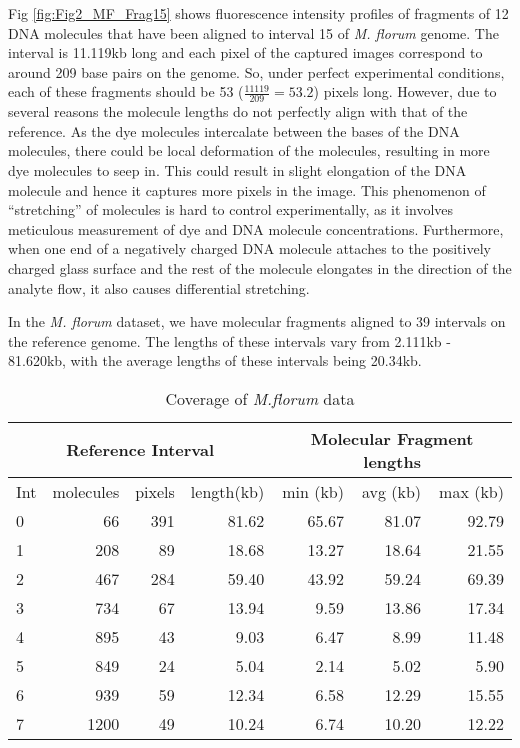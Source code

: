 Fig \ref{fig:Fig2_MF_Frag15} shows fluorescence intensity profiles of fragments of 12 DNA molecules that have been aligned to interval 15 of {\emph{M. florum}} genome. The interval is 11.119kb long and each pixel of the captured images correspond to around 209 base pairs on the genome. So, under perfect experimental conditions, each of these fragments should be 53 ($\frac{11119}{209} = 53.2$) pixels long. However, due to several reasons the molecule lengths do not perfectly align with that of the reference. As the dye molecules intercalate between the bases of the DNA molecules, there could be local deformation of the molecules, resulting in more dye molecules to seep in. This could result in slight elongation of the DNA molecule and hence it captures more pixels in the image. This phenomenon of ``stretching'' of molecules is hard to control experimentally, as it involves meticulous measurement of dye and DNA molecule concentrations. Furthermore, when one end of a negatively charged DNA molecule attaches to the positively charged glass surface and the rest of the molecule elongates in the direction of the analyte flow, it also causes differential stretching. 

In the {\emph{M. florum}} dataset, we have molecular fragments aligned to 39 intervals on the reference genome. The lengths of these intervals vary from 2.111kb - 81.620kb, with the average lengths of these intervals being 20.34kb. 
\begin{table}[H]
\centering
\begin{tabular}{lrrr|rrr}
  \hline
  \hline
  \multicolumn{4}{c}{Reference Interval} & \multicolumn{3}{c}{Molecular Fragment lengths} \\
  \hline
   Int  & molecules & pixels & length(kb) & min (kb) & avg (kb) & max (kb)\\ 
  \hline
  \hline
    0 &  66 & 391 & 81.62 & 65.67 & 81.07 & 92.79 \\ 
    1 & 208 & 89 & 18.68 & 13.27 & 18.64 & 21.55 \\ 
    2 & 467 & 284 & 59.40 & 43.92 & 59.24 & 69.39 \\ 
    3 & 734 & 67 & 13.94 & 9.59 & 13.86 & 17.34 \\ 
    4 & 895 & 43 & 9.03 & 6.47 & 8.99 & 11.48 \\ 
    5 & 849 & 24 & 5.04 & 2.14 & 5.02 & 5.90 \\ 
    6 & 939 & 59 & 12.34 & 6.58 & 12.29 & 15.55 \\ 
    7 & 1200 & 49 & 10.24 & 6.74 & 10.20 & 12.22 \\ 
  \hline
  \hline
\end{tabular}
\caption{Coverage of {\emph{M.florum}} data}
\label{tab:mftable}
\end{table}

